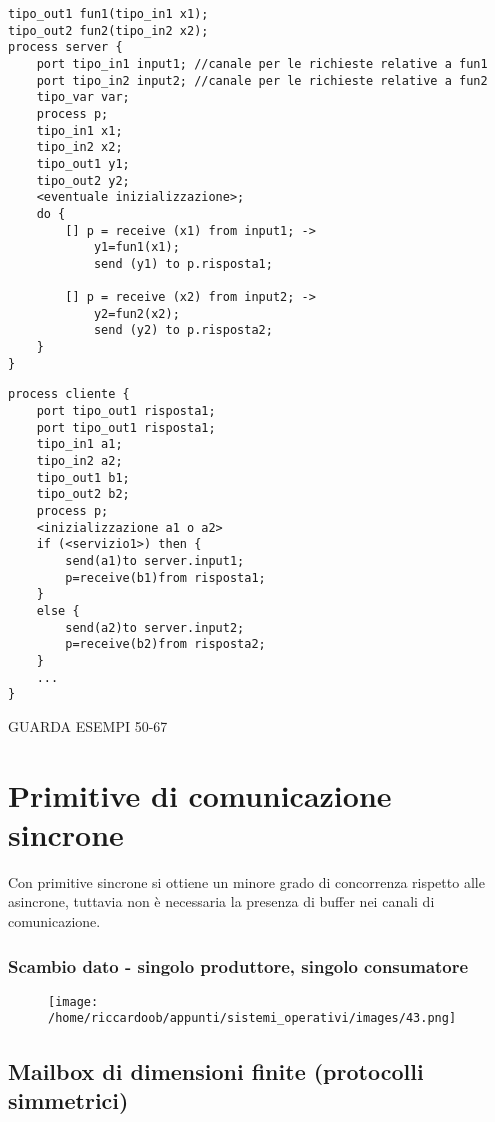 \begin{verbatim}
tipo_out1 fun1(tipo_in1 x1);
tipo_out2 fun2(tipo_in2 x2);
process server {
    port tipo_in1 input1; //canale per le richieste relative a fun1
    port tipo_in2 input2; //canale per le richieste relative a fun2
    tipo_var var;
    process p;
    tipo_in1 x1;
    tipo_in2 x2;
    tipo_out1 y1;
    tipo_out2 y2;
    <eventuale inizializzazione>;
    do {
        [] p = receive (x1) from input1; ->
            y1=fun1(x1);
            send (y1) to p.risposta1;

        [] p = receive (x2) from input2; ->
            y2=fun2(x2);
            send (y2) to p.risposta2;
    }
}
\end{verbatim}

\begin{verbatim}
process cliente {
    port tipo_out1 risposta1;
    port tipo_out1 risposta1;
    tipo_in1 a1;
    tipo_in2 a2;
    tipo_out1 b1;
    tipo_out2 b2;
    process p;
    <inizializzazione a1 o a2>
    if (<servizio1>) then {
        send(a1)to server.input1;
        p=receive(b1)from risposta1;
    }
    else {
        send(a2)to server.input2;
        p=receive(b2)from risposta2;
    }
    ...
}
\end{verbatim}


GUARDA ESEMPI 50-67

\section{Primitive di comunicazione sincrone}
Con primitive sincrone si ottiene un minore grado di concorrenza rispetto alle asincrone, tuttavia non è necessaria la presenza di buffer nei canali di comunicazione.

\subsubsection{Scambio dato - singolo produttore, singolo consumatore}
\begin{figure}[H]
    \centering
    \texttt{[image: /home/riccardoob/appunti/sistemi\_operativi/images/43.png]}
\end{figure}

\subsection{Mailbox di dimensioni finite (protocolli simmetrici)}

